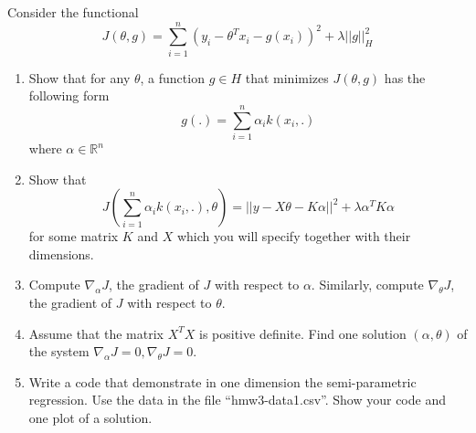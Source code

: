 \documentclass{article}[12pt]
\begin{document}
Consider the functional 
\begin{equation}
J(\theta,g) = \sum_{i=1}^n \left(y_i - \theta^T x_i - g(x_i)\right)^2 + \lambda ||g||_H^2
\end{equation}
\begin{enumerate}
\item 
Show that for any $\theta$, a function $g \in H$ that minimizes $J(\theta,g)$ has the following form 
\begin{equation}
g(.)=\sum_{i=1}^n \alpha_i k(x_i,.)
\end{equation}
where $\alpha \in \mathbb{R}^n$ 
\item 
Show that 
\begin{equation}
J(\sum_{i=1}^n \alpha_i k(x_i,.),\theta)=||y - X\theta - K\alpha||^2 + \lambda \alpha^T K \alpha
\end{equation}
for some matrix $K$ and $X$ which you will specify together with their dimensions. 
\item Compute $\nabla_\alpha J$, the gradient of $J$ with respect to $\alpha$. Similarly, compute $\nabla_\theta J$, the gradient of $J$ with respect to $\theta$. 
\item Assume that the matrix $X^TX$ is positive definite.
Find one solution $(\alpha,\theta)$ of the system  $\nabla_\alpha J=0, \nabla_\theta J=0$.  
\item 
Write a code that demonstrate in one dimension the semi-parametric regression. Use the data in the file ``hmw3-data1.csv''. Show your code and one plot of a solution.  
\end{enumerate}
\end{document}
